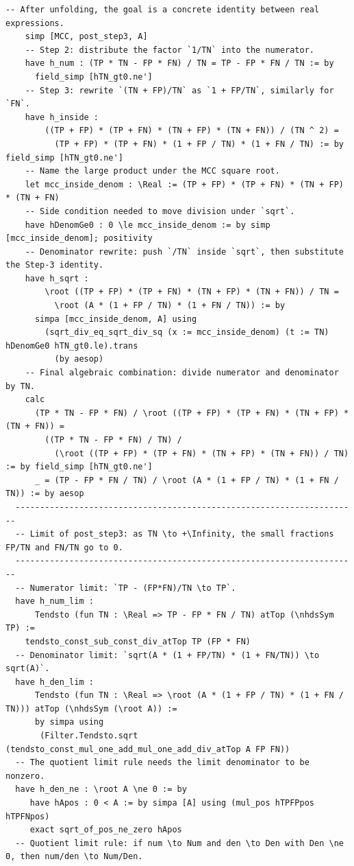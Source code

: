 \documentclass{article}
\begin{document}
\begin{lstlisting}[language=lean, firstnumber=last]
    -- After unfolding, the goal is a concrete identity between real expressions.
    simp [MCC, post_step3, A]
    -- Step 2: distribute the factor `1/TN` into the numerator.
    have h_num : (TP * TN - FP * FN) / TN = TP - FP * FN / TN := by
      field_simp [hTN_gt0.ne'] 
    -- Step 3: rewrite `(TN + FP)/TN` as `1 + FP/TN`, similarly for `FN`.
    have h_inside :
        ((TP + FP) * (TP + FN) * (TN + FP) * (TN + FN)) / (TN ^ 2) =
          (TP + FP) * (TP + FN) * (1 + FP / TN) * (1 + FN / TN) := by field_simp [hTN_gt0.ne']
    -- Name the large product under the MCC square root.
    let mcc_inside_denom : \Real := (TP + FP) * (TP + FN) * (TN + FP) * (TN + FN)
    -- Side condition needed to move division under `sqrt`.
    have hDenomGe0 : 0 \le mcc_inside_denom := by simp [mcc_inside_denom]; positivity
    -- Denominator rewrite: push `/TN` inside `sqrt`, then substitute the Step-3 identity.
    have h_sqrt :
        \root ((TP + FP) * (TP + FN) * (TN + FP) * (TN + FN)) / TN =
          \root (A * (1 + FP / TN) * (1 + FN / TN)) := by
      simpa [mcc_inside_denom, A] using
        (sqrt_div_eq_sqrt_div_sq (x := mcc_inside_denom) (t := TN) hDenomGe0 hTN_gt0.le).trans
          (by aesop)
    -- Final algebraic combination: divide numerator and denominator by TN.
    calc
      (TP * TN - FP * FN) / \root ((TP + FP) * (TP + FN) * (TN + FP) * (TN + FN)) =
        ((TP * TN - FP * FN) / TN) /
          (\root ((TP + FP) * (TP + FN) * (TN + FP) * (TN + FN)) / TN) := by field_simp [hTN_gt0.ne']
      _ = (TP - FP * FN / TN) / \root (A * (1 + FP / TN) * (1 + FN / TN)) := by aesop
  ----------------------------------------------------------------------
  -- Limit of post_step3: as TN \to +\Infinity, the small fractions FP/TN and FN/TN go to 0.
  ----------------------------------------------------------------------
  -- Numerator limit: `TP - (FP*FN)/TN \to TP`.
  have h_num_lim :
      Tendsto (fun TN : \Real => TP - FP * FN / TN) atTop (\nhdsSym TP) :=
    tendsto_const_sub_const_div_atTop TP (FP * FN)
  -- Denominator limit: `sqrt(A * (1 + FP/TN) * (1 + FN/TN)) \to sqrt(A)`.
  have h_den_lim :
      Tendsto (fun TN : \Real => \root (A * (1 + FP / TN) * (1 + FN / TN))) atTop (\nhdsSym (\root A)) :=
      by simpa using
       (Filter.Tendsto.sqrt (tendsto_const_mul_one_add_mul_one_add_div_atTop A FP FN))
  -- The quotient limit rule needs the limit denominator to be nonzero.
  have h_den_ne : \root A \ne 0 := by
     have hApos : 0 < A := by simpa [A] using (mul_pos hTPFPpos hTPFNpos)
     exact sqrt_of_pos_ne_zero hApos
  -- Quotient limit rule: if num \to Num and den \to Den with Den \ne 0, then num/den \to Num/Den.

\end{lstlisting}
\end{document}
